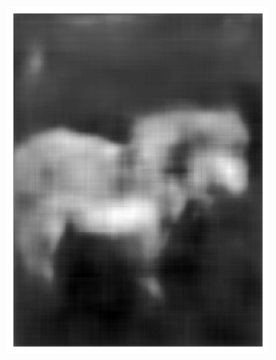\documentclass{l4proj}
\begin{document}
\begin{figure}[ht]
\begin{subfigure}[h!]{0.22\textwidth}
    \includegraphics[width=\textwidth, trim={0cm, 1cm, 0cm, 1cm}, clip]{images/autoencoder/pony_1/auto.png}


\end{subfigure}
\end{figure}
\end{document}
